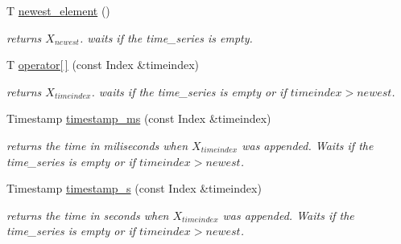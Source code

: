 \begin{DoxyCompactItemize}
\mbox{\label{classtime__series_1_1internal_1_1TimeSeriesBase_a12bd405933d326fd8396fb2bc1267223}} 
T \hyperlink{classtime__series_1_1internal_1_1TimeSeriesBase_a12bd405933d326fd8396fb2bc1267223}{newest\+\_\+element} ()
\begin{DoxyCompactList}\small\item\em returns $ X_{newest} $. waits if the time\+\_\+series is empty. \end{DoxyCompactList}\item 
\mbox{\label{classtime__series_1_1internal_1_1TimeSeriesBase_aa7267458e4fadff7314037a4bd1d53bb}} 
T \hyperlink{classtime__series_1_1internal_1_1TimeSeriesBase_aa7267458e4fadff7314037a4bd1d53bb}{operator\mbox{[}$\,$\mbox{]}} (const Index \&timeindex)
\begin{DoxyCompactList}\small\item\em returns $ X_{timeindex} $. waits if the time\+\_\+series is empty or if $timeindex > newest $. \end{DoxyCompactList}\item 
\mbox{\label{classtime__series_1_1internal_1_1TimeSeriesBase_a1e4c7ca710bb14e7dce57a1dd9c4f929}} 
Timestamp \hyperlink{classtime__series_1_1internal_1_1TimeSeriesBase_a1e4c7ca710bb14e7dce57a1dd9c4f929}{timestamp\+\_\+ms} (const Index \&timeindex)
\begin{DoxyCompactList}\small\item\em returns the time in miliseconds when $ X_{timeindex} $ was appended. Waits if the time\+\_\+series is empty or if $timeindex > newest $. \end{DoxyCompactList}\item 
\mbox{\label{classtime__series_1_1internal_1_1TimeSeriesBase_aacca694af4c53fa4ae9cd3593c12bf58}} 
Timestamp \hyperlink{classtime__series_1_1internal_1_1TimeSeriesBase_aacca694af4c53fa4ae9cd3593c12bf58}{timestamp\+\_\+s} (const Index \&timeindex)
\begin{DoxyCompactList}\small\item\em returns the time in seconds when $ X_{timeindex} $ was appended. Waits if the time\+\_\+series is empty or if $timeindex > newest $. \end{DoxyCompactList}\item 

\end{DoxyCompactItemize}
